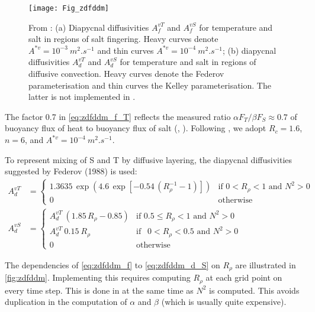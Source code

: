 \documentclass[../main/NEMO_manual]{subfiles}
\begin{document}
\begin{figure}[!t]
  \begin{center}
    \texttt{[image: Fig\_zdfddm]}
    \caption{
      \protect\label{fig:zdfddm}
      From \citet{Merryfield1999} :
      (a) Diapycnal diffusivities $A_f^{vT}$ and $A_f^{vS}$ for temperature and salt in regions of salt fingering.
      Heavy curves denote $A^{\ast v} = 10^{-3}~m^2.s^{-1}$ and thin curves $A^{\ast v} = 10^{-4}~m^2.s^{-1}$;
      (b) diapycnal diffusivities $A_d^{vT}$ and $A_d^{vS}$ for temperature and salt in regions of
      diffusive convection.
      Heavy curves denote the Federov parameterisation and thin curves the Kelley parameterisation.
      The latter is not implemented in \NEMO.
    }
  \end{center}
\end{figure}

The factor 0.7 in \autoref{eq:zdfddm_f_T} reflects the measured ratio $\alpha F_T /\beta F_S \approx  0.7$ of
buoyancy flux of heat to buoyancy flux of salt (\eg, \citet{McDougall_Taylor_JMR84}).
Following  \citet{Merryfield1999}, we adopt $R_c = 1.6$, $n = 6$, and $A^{\ast v} = 10^{-4}~m^2.s^{-1}$.

To represent mixing of S and T by diffusive layering,  the diapycnal diffusivities suggested by
Federov (1988) is used: 
\begin{align}
  A_d^{vT} &=
             \begin{cases}
               1.3635 \, \exp{\left( 4.6\, \exp{ \left[  -0.54\,( R_{\rho}^{-1} - 1 )  \right] }    \right)}
               &\text{if  $0<R_\rho < 1$ and $N^2>0$ } \\
               0 								&\text{otherwise}
             \end{cases}
                                       \nonumber \\
  \label{eq:zdfddm_d_S}
  A_d^{vS} &=
             \begin{cases}
               A_d^{vT}\ \left( 1.85\,R_{\rho} - 0.85 \right) &\text{if  $0.5 \leq R_\rho<1$ and $N^2>0$ } \\
               A_d^{vT} \ 0.15 \ R_\rho               &\text{if  $\ \ 0 < R_\rho<0.5$ and $N^2>0$ } \\
               0 								&\text{otherwise}
             \end{cases}
\end{align}

The dependencies of \autoref{eq:zdfddm_f} to \autoref{eq:zdfddm_d_S} on $R_\rho$ are illustrated in
\autoref{fig:zdfddm}.
Implementing this requires computing $R_\rho$ at each grid point on every time step.
This is done in  at the same time as $N^2$ is computed.
This avoids duplication in the computation of $\alpha$ and $\beta$ (which is usually quite expensive).
\end{document}
